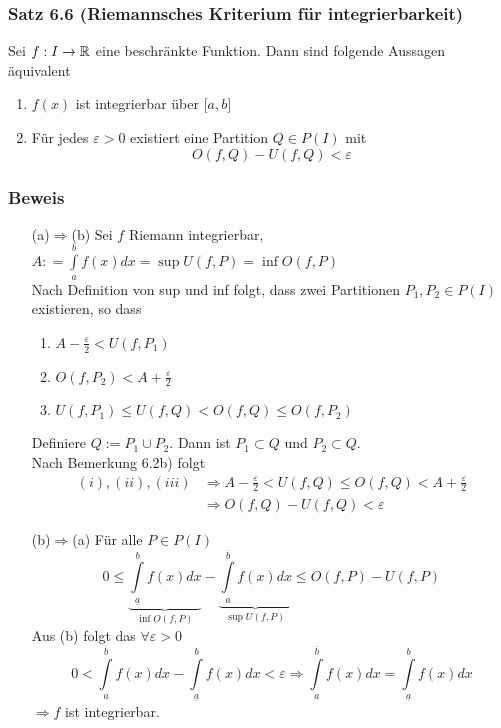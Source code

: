 \subsubsection*{Satz 6.6 (Riemannsches Kriterium für integrierbarkeit)}
Sei $f:I\to\mathbb{R}$ eine beschränkte Funktion. Dann sind folgende Aussagen äquivalent
\begin{enumerate}
\item $f(x)$ ist integrierbar über $\lbrack a,b\rbrack$
\item Für jedes $\varepsilon>0$ existiert eine Partition $Q\in P(I)$ mit \[O(f,Q)-U(f,Q)<\varepsilon\]
\end{enumerate}
\subsubsection*{Beweis}




\begin{enumerate}[align=left]
\item[(a)$\Rightarrow$(b)] Sei $f$ Riemann integrierbar, $A: = \int\limits_a^b {f(x)dx = \sup U(f,P) = \inf O(f,P)}$\\
Nach Definition von sup und inf folgt, dass zwei Partitionen $P_1,P_2\in P(I)$ existieren, so dass

\begin{enumerate}[\indent $(i)$]
\item $A-\frac{\varepsilon}{2}<U(f,P_1)$
\item $O(f,P_2)<A+\frac{\varepsilon}{2}$
\item $U(f,P_1) \leq U(f,Q) < O(f,Q) \leq O(f,P_2)$
\end{enumerate}

Definiere $Q:=P_1\cup P_2$. Dann ist $P_1\subset Q$ und $P_2 \subset Q$.\\
Nach Bemerkung 6.2b) folgt
\begin{align*}
(i),(ii),(iii)&\Rightarrow A-\frac{\varepsilon}{2}<U(f,Q)\leq O(f,Q)<A+\frac{\varepsilon}{2}\\
&\Rightarrow O(f,Q)-U(f,Q) < \varepsilon
\end{align*}
\item[(b)$\Rightarrow$(a)] Für alle $P\in P(I)$ \[0 \le \underbrace {\int\limits_{\underline{a}}^b {f(x)dx} }_{\inf O(f,P)} - \underbrace {\int\limits_a^{\overline{b}} {f(x)dx} }_{\sup U(f,P)} \le O(f,P) - U(f,P)\]
Aus (b) folgt das $\forall\varepsilon>0$ \[0 < \int\limits_a^{\overline{b}} {f(x)dx - \int\limits_{\underline{a}}^b {f(x)dx < \varepsilon } } \Rightarrow \int\limits_a^{\overline{b}} {f(x)dx = \int\limits_{\underline{a}}^b {f(x)dx} } \] $\Rightarrow f$ ist integrierbar.
\end{enumerate}

